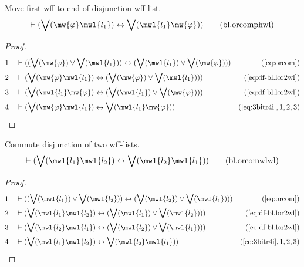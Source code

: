 \begin{lemma} {Move first wff to end of disjunction
wff-list.}
\begin{align}
\vdash ( \bigvee( \mw{\varphi} \mwl{l_1} ) \leftrightarrow \bigvee( \mwl{l_1}
    \mw{\varphi} ) )\label{eq:bl.orcomphwl}\tag{bl.orcomphwl}
\end{align}
\end{lemma}


\begin{proof}
\begin{align}
  1 &&  & \vdash ( ( \bigvee( \mw{\varphi} ) \vee \bigvee( \mwl{l_1} ) )
     \leftrightarrow ( \bigvee( \mwl{l_1} ) \vee \bigvee(
     \mw{\varphi} ) ) )&(\mbox{\ref{eq:orcom}})\notag
  \\ 2 &&  & \vdash ( \bigvee( \mw{\varphi} \mwl{l_1} ) \leftrightarrow (
     \bigvee( \mw{\varphi} ) \vee \bigvee( \mwl{l_1} ) )
     )&(\mbox{\ref{eq:df-bl.lor2wl}})\notag
  \\ 3 &&  & \vdash ( \bigvee( \mwl{l_1} \mw{\varphi} ) \leftrightarrow (
     \bigvee( \mwl{l_1} ) \vee \bigvee( \mw{\varphi} ) )
     )&(\mbox{\ref{eq:df-bl.lor2wl}})\notag
  \\ 4 &&  & \vdash ( \bigvee( \mw{\varphi} \mwl{l_1} ) \leftrightarrow
     \bigvee( \mwl{l_1} \mw{\varphi} )
     )&(\mbox{\ref{eq:3bitr4i}},1,2,3)\notag
\end{align}
\end{proof}

\begin{lemma} {Commute disjunction of two wff-lists.}
\begin{align}
\vdash ( \bigvee( \mwl{l_1} \mwl{l_2} ) \leftrightarrow \bigvee( \mwl{l_2}
    \mwl{l_1} ) )\label{eq:bl.orcomwlwl}\tag{bl.orcomwlwl}
\end{align}
\end{lemma}


\begin{proof}
\begin{align}
  1 &&  & \vdash ( ( \bigvee( \mwl{l_1} ) \vee \bigvee( \mwl{l_2} ) )
     \leftrightarrow ( \bigvee( \mwl{l_2} ) \vee \bigvee(
     \mwl{l_1} ) ) )&(\mbox{\ref{eq:orcom}})\notag
  \\ 2 &&  & \vdash ( \bigvee( \mwl{l_1} \mwl{l_2} ) \leftrightarrow ( \bigvee(
     \mwl{l_1} ) \vee \bigvee( \mwl{l_2} ) )
     )&(\mbox{\ref{eq:df-bl.lor2wl}})\notag
  \\ 3 &&  & \vdash ( \bigvee( \mwl{l_2} \mwl{l_1} ) \leftrightarrow ( \bigvee(
     \mwl{l_2} ) \vee \bigvee( \mwl{l_1} ) )
     )&(\mbox{\ref{eq:df-bl.lor2wl}})\notag
  \\ 4 &&  & \vdash ( \bigvee( \mwl{l_1} \mwl{l_2} ) \leftrightarrow \bigvee(
     \mwl{l_2} \mwl{l_1} )
     )&(\mbox{\ref{eq:3bitr4i}},1,2,3)\notag
\end{align}
\end{proof}

